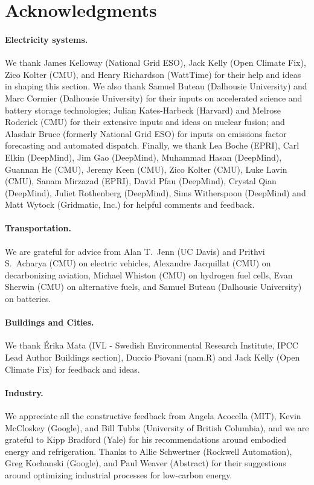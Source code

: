 \documentclass[11pt]{report}
\begin{document}
\section*{Acknowledgments}
\label{sec:acknowledgments}

\paragraph*{Electricity systems.} We thank James Kelloway (National Grid ESO), Jack Kelly (Open Climate Fix), Zico Kolter (CMU), and Henry Richardson (WattTime) for their help and ideas in shaping this section. We also thank Samuel Buteau (Dalhousie University) and Marc Cormier (Dalhousie University) for their inputs on accelerated science and battery storage technologies; Julian Kates-Harbeck (Harvard) and Melrose Roderick (CMU) for their extensive inputs and ideas on nuclear fusion; and Alasdair Bruce (formerly National Grid ESO) for inputs on emissions factor forecasting and automated dispatch. Finally, we thank Lea Boche (EPRI), Carl Elkin (DeepMind), Jim Gao (DeepMind), Muhammad Hasan (DeepMind), Guannan He (CMU), Jeremy Keen (CMU), Zico Kolter (CMU), Luke Lavin (CMU), Sanam Mirzazad (EPRI), David Pfau (DeepMind), Crystal Qian (DeepMind), Juliet Rothenberg (DeepMind), Sims Witherspoon (DeepMind) and Matt Wytock (Gridmatic, Inc.) for helpful comments and feedback.

\paragraph*{Transportation.}
We are grateful for advice from Alan T.~Jenn (UC Davis) and Prithvi S.~Acharya (CMU) on electric vehicles, Alexandre Jacquillat (CMU) on decarbonizing aviation, Michael Whiston (CMU) on hydrogen fuel cells, Evan Sherwin (CMU) on alternative fuels, and Samuel Buteau (Dalhousie University) on batteries.

\paragraph*{Buildings and Cities.} We thank \'Erika Mata (IVL - Swedish Environmental Research Institute, IPCC Lead Author Buildings section), Duccio Piovani (nam.R) and Jack Kelly (Open Climate Fix) for feedback and ideas.

\paragraph*{Industry.}
We appreciate all the constructive feedback from Angela Acocella (MIT), Kevin McCloskey (Google), and Bill Tubbs (University of British Columbia), and we are grateful to Kipp Bradford (Yale) for his recommendations around embodied energy and refrigeration. Thanks to Allie Schwertner (Rockwell Automation), Greg Kochanski (Google), and Paul Weaver (Abstract) for their suggestions around optimizing industrial processes for low-carbon energy.
\end{document}
